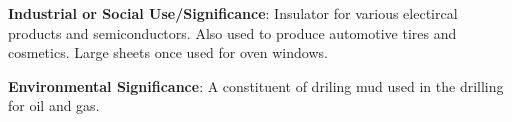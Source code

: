 \documentclass[10pt]{article}
\begin{document}
\begin{framed}
  \textbf{Industrial or Social Use/Significance}: Insulator for various electircal products and semiconductors. Also used to produce automotive tires and cosmetics. Large sheets once used for oven windows.
\end{framed}

\begin{framed}
  \textbf{Environmental Significance}: A constituent of driling mud used in the drilling for oil and gas.
\end{framed}

\end{document}
